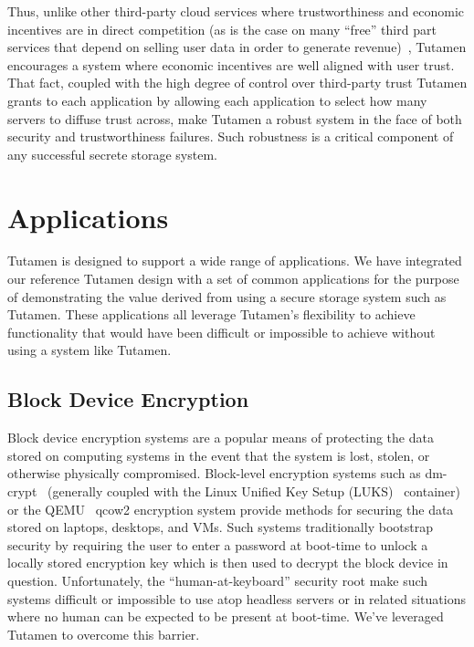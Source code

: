 Thus, unlike other third-party cloud services where trustworthiness
and economic incentives are in direct competition (as is the case on
many ``free'' third part services that depend on selling user data in
order to generate revenue)~\cite{flowerday2006}, Tutamen encourages a
system where economic incentives are well aligned with user
trust. That fact, coupled with the high degree of control over
third-party trust Tutamen grants to each application by allowing each
application to select how many servers to diffuse trust across, make
Tutamen a robust system in the face of both security and
trustworthiness failures. Such robustness is a critical component of
any successful secrete storage system.

\section{Applications}
\label{chap:tutamen:apps}

Tutamen is designed to support a wide range of applications. We have
integrated our reference Tutamen design with a set of common
applications for the purpose of demonstrating the value derived from
using a secure storage system such as Tutamen. These applications all
leverage Tutamen's flexibility to achieve functionality that would
have been difficult or impossible to achieve without using a system
like Tutamen.

\subsection{Block Device Encryption}

Block device encryption systems are a popular means of protecting the
data stored on computing systems in the event that the system is lost,
stolen, or otherwise physically compromised.  Block-level encryption
systems such as dm-crypt~\cite{dm-crypt} (generally coupled with the
Linux Unified Key Setup (LUKS)~\cite{luks} container) or the
QEMU~\cite{qemu} qcow2 encryption system provide methods for securing
the data stored on laptops, desktops, and VMs. Such systems
traditionally bootstrap security by requiring the user to enter a
password at boot-time to unlock a locally stored encryption key which
is then used to decrypt the block device in question. Unfortunately,
the ``human-at-keyboard'' security root make such systems difficult or
impossible to use atop headless servers or in related situations where
no human can be expected to be present at boot-time. We've leveraged
Tutamen to overcome this barrier.


